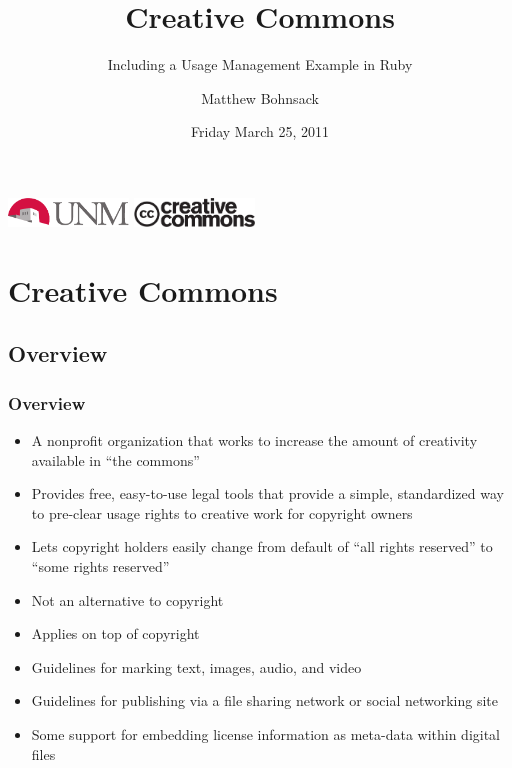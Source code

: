\documentclass[mathserif,xcolor=dvipsnames,hyperref={bookmarks=true}]{beamer}
\title[Creative Commons]{Creative Commons}
\subtitle{Including a Usage Management Example in Ruby}
\author[Matthew Bohnsack]{Matthew Bohnsack}
\institute[UNM]{University of New Mexico\\Albuquerque, New Mexico USA\\[2ex]\texttt{mbohnsac@unm.edu}}
\date{Friday March 25, 2011}
\begin{document}
\begin{frame}
    \titlepage
    \begin{center}
        \includegraphics[width=0.24\textwidth]{resources/logos/UNM/UNM_logo_PMS200C.pdf}
        \hspace{0.5in}
        \includegraphics[width=0.24\textwidth]{resources/cc/cc_logo.pdf}
    \end{center}
\end{frame}


\section{Creative Commons}
\begin{frame}[t]
\end{frame}

    \subsection{Overview}
    \begin{frame}[t]
        \frametitle{Overview}
        \begin{itemize}
            \item A nonprofit organization that works to increase the amount of
                  creativity available in ``the commons''
            \item Provides free, easy-to-use legal tools that provide a simple,
                  standardized way to pre-clear usage rights to creative work for copyright owners
            \item Lets copyright holders easily change from default of ``all
                  rights reserved'' to ``some rights reserved''
            \item Not an alternative to copyright
            \item Applies on top of copyright
            \item Guidelines for marking text, images, audio, and video
            \item Guidelines for publishing via a file sharing network or social networking site
            \item Some support for embedding license information as meta-data within digital files
        \end{itemize}
    \end{frame}
\end{document}
